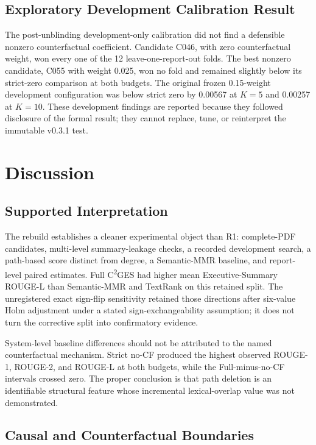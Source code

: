 \documentclass[applsci,article,submit,moreauthors]{Definitions/mdpi}
\newcommand{\cges}{C\textsuperscript{2}GES}
\begin{document}
\subsection{Exploratory Development Calibration Result}

The post-unblinding development-only calibration did not find a defensible nonzero counterfactual coefficient. Candidate C046, with zero counterfactual weight, won every one of the 12 leave-one-report-out folds. The best nonzero candidate, C055 with weight 0.025, won no fold and remained slightly below its strict-zero comparison at both budgets. The original frozen 0.15-weight development configuration was below strict zero by 0.00567 at $K=5$ and 0.00257 at $K=10$. These development findings are reported because they followed disclosure of the formal result; they cannot replace, tune, or reinterpret the immutable v0.3.1 test.

\section{Discussion}

\subsection{Supported Interpretation}

The rebuild establishes a cleaner experimental object than R1: complete-PDF candidates, multi-level summary-leakage checks, a recorded development search, a path-based score distinct from degree, a Semantic-MMR baseline, and report-level paired estimates. Full \cges{} had higher mean Executive-Summary ROUGE-L than Semantic-MMR and TextRank on this retained split. The unregistered exact sign-flip sensitivity retained those directions after six-value Holm adjustment under a stated sign-exchangeability assumption; it does not turn the corrective split into confirmatory evidence.

System-level baseline differences should not be attributed to the named counterfactual mechanism. Strict no-CF produced the highest observed ROUGE-1, ROUGE-2, and ROUGE-L at both budgets, while the Full-minus-no-CF intervals crossed zero. The proper conclusion is that path deletion is an identifiable structural feature whose incremental lexical-overlap value was not demonstrated.

\subsection{Causal and Counterfactual Boundaries}
\end{document}
